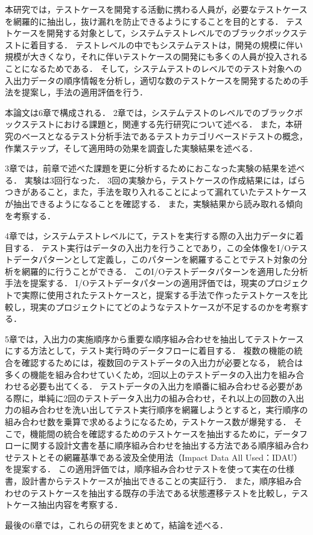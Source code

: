 本研究では，テストケースを開発する活動に携わる人員が，必要なテストケースを網羅的に抽出し，抜け漏れを防止できるようにすることを目的とする．
テストケースを開発する対象として，システムテストレベルでのブラックボックステストに着目する．
テストレベルの中でもシステムテストは，開発の規模に伴い規模が大きくなり，それに伴いテストケースの開発にも多くの人員が投入されることになるためである．
そして，システムテストのレベルでのテスト対象への入出力データの順序情報を分析し，適切な数のテストケースを開発するための手法を提案し，手法の適用評価を行う．

本論文は6章で構成される．
2章では，システムテストのレベルでのブラックボックステストにおける課題と，関連する先行研究について述べる．
また，本研究のベースとなるテスト分析手法であるテストカテゴリベースドテストの概念，作業ステップ，そして適用時の効果を調査した実験結果を述べる．

3章では，前章で述べた課題を更に分析するためにおこなった実験の結果を述べる．
実験は3回行なった．
3回の実験から，テストケースの作成結果には，ばらつきがあること，また，手法を取り入れることによって漏れていたテストケースが抽出できるようになることを確認する．
また，実験結果から読み取れる傾向を考察する．

4章では，システムテストレベルにて，テストを実行する際の入出力データに着目する．
テスト実行はデータの入出力を行うことであり，この全体像をI/Oテストデータパターンとして定義し，このパターンを網羅することでテスト対象の分析を網羅的に行うことができる．
このI/Oテストデータパターンを適用した分析手法を提案する．
I/Oテストデータパターンの適用評価では，現実のプロジェクトで実際に使用されたテストケースと，提案する手法で作ったテストケースを比較し，現実のプロジェクトにてどのようなテストケースが不足するのかを考察する．

5章では，入出力の実施順序から重要な順序組み合わせを抽出してテストケースにする方法として，テスト実行時のデータフローに着目する．
複数の機能の統合を確認するためには，複数回のテストデータの入出力が必要となる，
統合は多くの機能を組み合わせていくため，2回以上のテストデータの入出力を組み合わせる必要も出てくる．
テストデータの入出力を順番に組み合わせる必要がある際に，単純に2回のテストデータ入出力の組み合わせ，それ以上の回数の入出力の組み合わせを洗い出してテスト実行順序を網羅しようとすると，実行順序の組み合わせ数を乗算で求めるようになるため，テストケース数が爆発する．
そこで，機能間の統合を確認するためのテストケースを抽出するために，データフローに関する設計文書を基に順序組み合わせを抽出する方法である順序組み合わせテストとその網羅基準である波及全使用法（Impact Data All Used：IDAU）を提案する．
この適用評価では，順序組み合わせテストを使って実在の仕様書，設計書からテストケースが抽出できることの実証行う．
また，順序組み合わせのテストケースを抽出する既存の手法である状態遷移テストを比較し，テストケース抽出内容を考察する．

最後の6章では，これらの研究をまとめて，結論を述べる．
